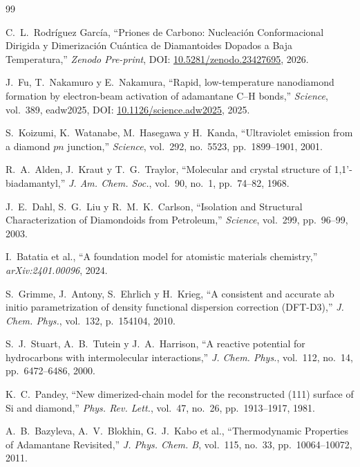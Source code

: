 \documentclass[10pt,twocolumn,a4paper]{article}
\begin{document}
\begin{thebibliography}{99}
\footnotesize

C.~L.~Rodríguez García, ``Priones de Carbono: Nucleación Conformacional Dirigida y Dimerización Cuántica de Diamantoides Dopados a Baja Temperatura,'' \textit{Zenodo Pre-print}, DOI: \href{https://doi.org/10.5281/zenodo.23427695}{10.5281/zenodo.23427695}, 2026.

J.~Fu, T.~Nakamuro y E.~Nakamura, ``Rapid, low-temperature nanodiamond formation by electron-beam activation of adamantane C--H bonds,'' \textit{Science}, vol.~389, eadw2025, DOI: \href{https://doi.org/10.1126/science.adw2025}{10.1126/science.adw2025}, 2025.

S.~Koizumi, K.~Watanabe, M.~Hasegawa y H.~Kanda, ``Ultraviolet emission from a diamond $pn$ junction,'' \textit{Science}, vol.~292, no.~5523, pp.~1899--1901, 2001.

R.~A.~Alden, J.~Kraut y T.~G.~Traylor, ``Molecular and crystal structure of 1,1'-biadamantyl,'' \textit{J. Am. Chem. Soc.}, vol.~90, no.~1, pp.~74--82, 1968.

J.~E.~Dahl, S.~G.~Liu y R.~M.~K.~Carlson, ``Isolation and Structural Characterization of Diamondoids from Petroleum,'' \textit{Science}, vol.~299, pp.~96--99, 2003.

I.~Batatia et al., ``A foundation model for atomistic materials chemistry,'' \textit{arXiv:2401.00096}, 2024.

S.~Grimme, J.~Antony, S.~Ehrlich y H.~Krieg, ``A consistent and accurate ab initio parametrization of density functional dispersion correction (DFT-D3),'' \textit{J. Chem. Phys.}, vol.~132, p.~154104, 2010.

S.~J.~Stuart, A.~B.~Tutein y J.~A.~Harrison, ``A reactive potential for hydrocarbons with intermolecular interactions,'' \textit{J. Chem. Phys.}, vol.~112, no.~14, pp.~6472--6486, 2000.

K.~C.~Pandey, ``New dimerized-chain model for the reconstructed (111) surface of Si and diamond,'' \textit{Phys. Rev. Lett.}, vol.~47, no.~26, pp.~1913--1917, 1981.

A.~B.~Bazyleva, A.~V.~Blokhin, G.~J.~Kabo et al., ``Thermodynamic Properties of Adamantane Revisited,'' \textit{J. Phys. Chem. B}, vol.~115, no.~33, pp.~10064--10072, 2011.


\end{thebibliography}
\end{document}
